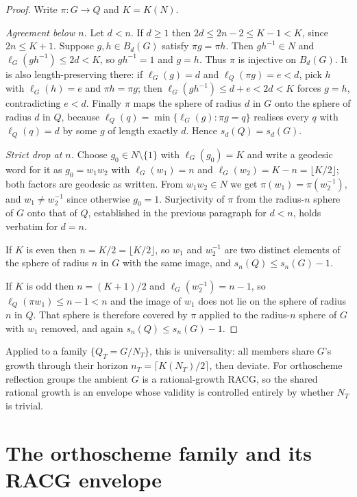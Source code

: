 \documentclass[11pt]{article}
\theoremstyle{definition}
\begin{document}
\begin{proof}
Write $\pi:G\to Q$ and $K=K(N)$.

\emph{Agreement below $n$.} Let $d<n$. If $d\ge1$ then $2d\le 2n-2\le K-1<K$, since $2n\le K+1$. Suppose
$g,h\in B_d(G)$ satisfy $\pi g=\pi h$. Then $gh^{-1}\in N$ and $\ell_G(gh^{-1})\le 2d<K$, so $gh^{-1}=1$
and $g=h$. Thus $\pi$ is injective on $B_d(G)$. It is also length-preserving there: if
$\ell_G(g)=d$ and $\ell_Q(\pi g)=e<d$, pick $h$ with $\ell_G(h)=e$ and $\pi h=\pi g$; then
$\ell_G(gh^{-1})\le d+e<2d<K$ forces $g=h$, contradicting $e<d$. Finally $\pi$ maps the sphere of radius
$d$ in $G$ onto the sphere of radius $d$ in $Q$, because $\ell_Q(q)=\min\{\ell_G(g):\pi g=q\}$ realises
every $q$ with $\ell_Q(q)=d$ by some $g$ of length exactly $d$. Hence $s_d(Q)=s_d(G)$.

\emph{Strict drop at $n$.} Choose $g_0\in N\setminus\{1\}$ with $\ell_G(g_0)=K$ and write a geodesic word
for it as $g_0=w_1w_2$ with $\ell_G(w_1)=n$ and $\ell_G(w_2)=K-n=\lfloor K/2\rfloor$; both factors are
geodesic as written. From $w_1w_2\in N$ we get $\pi(w_1)=\pi(w_2^{-1})$, and $w_1\ne w_2^{-1}$ since
otherwise $g_0=1$. Surjectivity of $\pi$ from the radius-$n$ sphere of $G$ onto that of $Q$, established
in the previous paragraph for $d<n$, holds verbatim for $d=n$.

If $K$ is even then $n=K/2=\lfloor K/2\rfloor$, so $w_1$ and $w_2^{-1}$ are two distinct elements of the
sphere of radius $n$ in $G$ with the same image, and $s_n(Q)\le s_n(G)-1$.

If $K$ is odd then $n=(K+1)/2$ and $\ell_G(w_2^{-1})=n-1$, so $\ell_Q(\pi w_1)\le n-1<n$ and the image of
$w_1$ does not lie on the sphere of radius $n$ in $Q$. That sphere is therefore covered by
$\pi$ applied to the radius-$n$ sphere of $G$ with $w_1$ removed, and again $s_n(Q)\le s_n(G)-1$.
\end{proof}

Applied to a family $\{Q_T=G/N_T\}$, this is universality: all members share $G$'s growth through their
horizon $n_T=\lceil K(N_T)/2\rceil$, then deviate. For orthoscheme reflection groups the ambient $G$ is a
rational-growth RACG, so the shared rational growth is an envelope whose validity is controlled entirely
by whether $N_T$ is trivial.

\section{The orthoscheme family and its RACG envelope}
\end{document}
